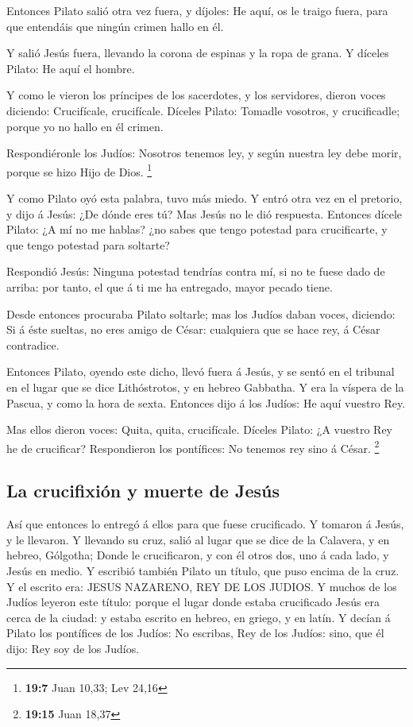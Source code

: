  Entonces Pilato salió otra vez fuera, y díjoles: He aquí,
os le traigo fuera, para que entendáis que ningún crimen hallo en él.

 Y salió Jesús fuera, llevando la corona de espinas y la
ropa de grana. Y díceles Pilato: He aquí el hombre.

 Y como le vieron los príncipes de los sacerdotes, y los
servidores, dieron voces diciendo: Crucifícale, crucifícale. Díceles
Pilato: Tomadle vosotros, y crucificadle; porque yo no hallo en él
crimen.

 Respondiéronle los Judíos: Nosotros tenemos ley, y según
nuestra ley debe morir, porque se hizo Hijo de Dios. \footnote{\textbf{19:7}
  Juan 10,33; Lev 24,16}

 Y como Pilato oyó esta palabra, tuvo más miedo.
 Y entró otra vez en el pretorio, y dijo á Jesús: ¿De
dónde eres tú? Mas Jesús no le dió respuesta.  Entonces
dícele Pilato: ¿A mí no me hablas? ¿no sabes que tengo potestad para
crucificarte, y que tengo potestad para soltarte?

 Respondió Jesús: Ninguna potestad tendrías contra mí, si
no te fuese dado de arriba: por tanto, el que á ti me ha entregado,
mayor pecado tiene.

 Desde entonces procuraba Pilato soltarle; mas los Judíos
daban voces, diciendo: Si á éste sueltas, no eres amigo de César:
cualquiera que se hace rey, á César contradice.

 Entonces Pilato, oyendo este dicho, llevó fuera á Jesús,
y se sentó en el tribunal en el lugar que se dice Lithóstrotos, y en
hebreo Gabbatha.  Y era la víspera de la Pascua, y como
la hora de sexta. Entonces dijo á los Judíos: He aquí vuestro Rey.

 Mas ellos dieron voces: Quita, quita, crucifícale.
Díceles Pilato: ¿A vuestro Rey he de crucificar? Respondieron los
pontífices: No tenemos rey sino á César. \footnote{\textbf{19:15} Juan
  18,37}

\hypertarget{la-crucifixiuxf3n-y-muerte-de-jesuxfas}{%
\subsection{La crucifixión y muerte de
Jesús}\label{la-crucifixiuxf3n-y-muerte-de-jesuxfas}}

 Así que entonces lo entregó á ellos para que fuese
crucificado. Y tomaron á Jesús, y le llevaron.  Y
llevando su cruz, salió al lugar que se dice de la Calavera, y en
hebreo, Gólgotha;  Donde le crucificaron, y con él otros
dos, uno á cada lado, y Jesús en medio.  Y escribió
también Pilato un título, que puso encima de la cruz. Y el escrito era:
JESUS NAZARENO, REY DE LOS JUDIOS.  Y muchos de los
Judíos leyeron este título: porque el lugar donde estaba crucificado
Jesús era cerca de la ciudad: y estaba escrito en hebreo, en griego, y
en latín.  Y decían á Pilato los pontífices de los
Judíos: No escribas, Rey de los Judíos: sino, que él dijo: Rey soy de
los Judíos.

